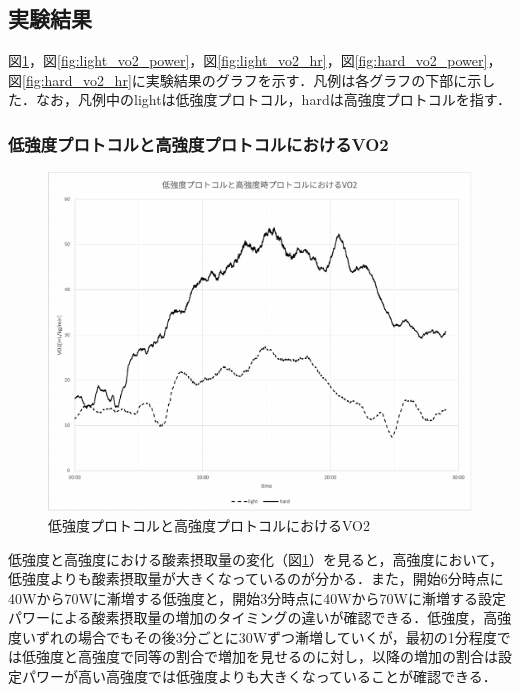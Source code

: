 \subsection{実験結果}

図\ref{fig:light_hard_vo2}，図\ref{fig:light_vo2_power}，図\ref{fig:light_vo2_hr}，図\ref{fig:hard_vo2_power}，図\ref{fig:hard_vo2_hr}に実験結果のグラフを示す．凡例は各グラフの下部に示した．なお，凡例中のlightは低強度プロトコル，hardは高強度プロトコルを指す．

\subsubsection{低強度プロトコルと高強度プロトコルにおけるVO2}

\begin{figure}[H]
  \begin{center}
    \includegraphics[width=12cm]{fig/light_hard_vo2}
    \caption{低強度プロトコルと高強度プロトコルにおけるVO2}
    \label{fig:light_hard_vo2}
  \end{center}
\end{figure}

低強度と高強度における酸素摂取量の変化（図\ref{fig:light_hard_vo2}）を見ると，高強度において，低強度よりも酸素摂取量が大きくなっているのが分かる．また，開始6分時点に40Wから70Wに漸増する低強度と，開始3分時点に40Wから70Wに漸増する設定パワーによる酸素摂取量の増加のタイミングの違いが確認できる．低強度，高強度いずれの場合でもその後3分ごとに30Wずつ漸増していくが，最初の1分程度では低強度と高強度で同等の割合で増加を見せるのに対し，以降の増加の割合は設定パワーが高い高強度では低強度よりも大きくなっていることが確認できる．

